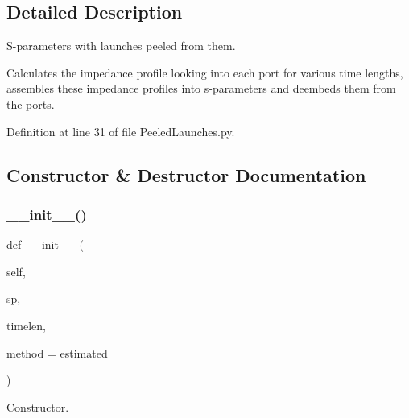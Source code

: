 \subsection{Detailed Description}
S-\/parameters with launches peeled from them. 

Calculates the impedance profile looking into each port for various time lengths, assembles these impedance profiles into s-\/parameters and deembeds them from the ports. 

Definition at line 31 of file Peeled\+Launches.\+py.



\subsection{Constructor \& Destructor Documentation}
\mbox{\label{classSignalIntegrity_1_1ImpedanceProfile_1_1PeeledLaunches_1_1PeeledLaunches_a5ad5af04a370e25cc809b024b20dd7ba}} 
\subsubsection{\texorpdfstring{\+\_\+\+\_\+init\+\_\+\+\_\+()}{\_\_init\_\_()}}
{\footnotesize\ttfamily def \+\_\+\+\_\+init\+\_\+\+\_\+ (\begin{DoxyParamCaption}\item[{}]{self,  }\item[{}]{sp,  }\item[{}]{timelen,  }\item[{}]{method = {\ttfamily \textquotesingle{}estimated\textquotesingle{}} }\end{DoxyParamCaption})}



Constructor. 


